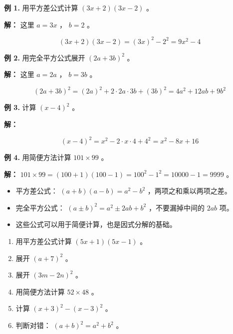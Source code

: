 \begin{workedexamples}


\textbf{例 1.} 用平方差公式计算 $(3x + 2)(3x - 2)$ 。

\textbf{解：} 这里 $a = 3x$ ， $b = 2$ 。

\[
(3x + 2)(3x - 2) = (3x)^2 - 2^2 = 9x^2 - 4
\]


\textbf{例 2.} 用完全平方公式展开 $(2a + 3b)^2$ 。

\textbf{解：} 这里 $a = 2a$ ， $b = 3b$ 。

\[
(2a + 3b)^2 = (2a)^2 + 2 \cdot 2a \cdot 3b + (3b)^2 = 4a^2 + 12ab + 9b^2
\]


\textbf{例 3.} 计算 $(x - 4)^2$ 。

\textbf{解：}

\[
(x - 4)^2 = x^2 - 2 \cdot x \cdot 4 + 4^2 = x^2 - 8x + 16
\]


\textbf{例 4.} 用简便方法计算 $101 \times 99$ 。

\textbf{解：} $101 \times 99 = (100 + 1)(100 - 1) = 100^2 - 1^2 = 10000 - 1 = 9999$ 。

\end{workedexamples}

\begin{keytakeaway}


\begin{itemize}
  \item 平方差公式： $(a+b)(a-b) = a^2 - b^2$ ，两项之和乘以两项之差。
  \item 完全平方公式： $(a \pm b)^2 = a^2 \pm 2ab + b^2$ ，不要漏掉中间的 $2ab$ 项。
  \item 这些公式可以用于简便计算，也是因式分解的基础。
\end{itemize}


\end{keytakeaway}

\begin{practice}


\begin{enumerate}
  \item 用平方差公式计算 $(5x + 1)(5x - 1)$ 。
  \item 展开 $(a + 7)^2$ 。
  \item 展开 $(3m - 2n)^2$ 。
  \item 用简便方法计算 $52 \times 48$ 。
  \item 计算 $(x + 3)^2 - (x - 3)^2$ 。
  \item 判断对错： $(a + b)^2 = a^2 + b^2$ 。
\end{enumerate}


\end{practice}

